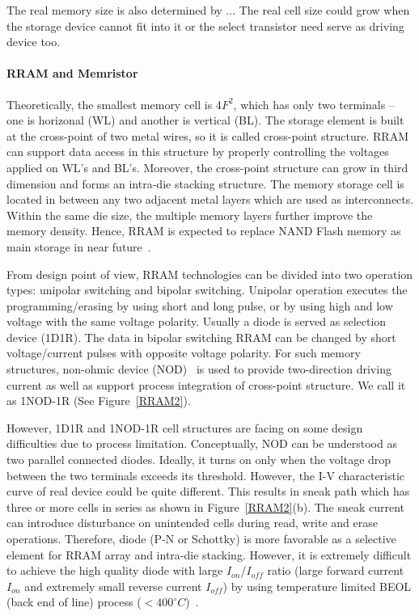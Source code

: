The real memory size is also determined by ...
The real cell size could grow when the storage device cannot fit into it or the select transistor need serve as driving device too.



\paragraph{RRAM and Memristor}

Theoretically, the smallest memory cell is 4$F^2$, which has only two terminals -- one is horizonal (WL) and another is vertical (BL). The storage element is built at the cross-point of two metal wires, so it is called cross-point structure. RRAM can support data access in this structure by properly controlling the voltages applied on WL's and BL's. Moreover, the cross-point structure can grow in third dimension and forms an intra-die stacking structure. The memory storage cell is located in between any two adjacent metal layers which are used as interconnects. Within the same die size, the multiple memory layers further improve the memory density. Hence, RRAM is expected to replace NAND Flash memory as main storage in near future~\cite{ITRS07}.

From design point of view, RRAM technologies can be divided into two operation types: unipolar switching and bipolar switching. Unipolar operation executes the programming/erasing by using short and long pulse, or by using high and low voltage with the same voltage polarity. Usually a diode is served as selection device (1D1R). The data in bipolar switching RRAM can be changed by short voltage/current pulses with opposite voltage polarity. For such memory structures, non-ohmic device (NOD)~\cite{Yan4430255} is used to provide two-direction driving current as well as support process integration of cross-point structure. We call it as 1NOD-1R (See Figure~\ref{RRAM2}).

However, 1D1R and 1NOD-1R cell structures are facing on some design difficulties due to process limitation. Conceptually, NOD can be understood as two parallel connected diodes. Ideally, it turns on only when the voltage drop between the two terminals exceeds its threshold. However, the I-V characteristic curve of real device could be quite different.
This results in sneak path which has three or more cells in series as shown in Figure~\ref{RRAM2}(b). The sneak current can introduce disturbance on unintended cells during read, write and erase operations. Therefore, diode (P-N or Schottky) is more favorable as a selective element for RRAM array and intra-die stacking. However, it is extremely difficult to achieve the high quality diode with large $I_{on}$/$I_{off}$ ratio (large forward current $I_{on}$ and extremely small reverse current $I_{off}$) by using temperature limited BEOL (back end of line) process ($<400 ^{\circ}C$)~\cite{Sun:147791}.




